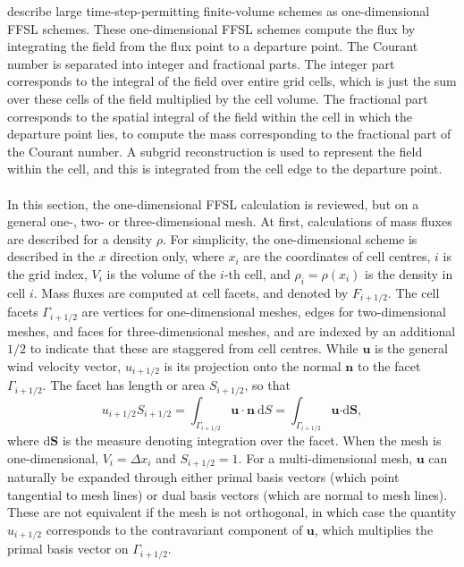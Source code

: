 \documentclass{ametsocV6.1}
\begin{document}
\citet{lin1996ffsl} describe large time-step-permitting finite-volume schemes as one-dimensional FFSL schemes. These one-dimensional FFSL schemes compute the flux by integrating the field from the flux point to a departure point. The Courant number is separated into integer and fractional parts. The integer part corresponds to the integral of the field over entire grid cells, which is just the sum over these cells of the field multiplied by the cell volume. The fractional part corresponds to the spatial integral of the field within the cell in which the departure point lies, to compute the mass corresponding to the fractional part of the Courant number. A subgrid reconstruction is used to represent the field within the cell, and this is integrated from the cell edge to the departure point. \\
\\
In this section, the one-dimensional FFSL calculation is reviewed, but on a general one-, two- or three-dimensional mesh.
At first, calculations of mass fluxes are described for a density $\rho$.
For simplicity, the one-dimensional scheme is described in the $x$ direction only, where $x_i$ are the coordinates of cell centres, $i$ is the grid index, $V_i$ is the volume of the $i$-th cell, and $\rho_i=\rho(x_i)$ is the density in cell $i$.
Mass fluxes are computed at cell facets, and denoted by $F_{i+1/2}$.
The cell facets $\varGamma_{i+1/2}$ are vertices for one-dimensional meshes, edges for two-dimensional meshes, and faces for three-dimensional meshes, and are indexed by an additional $1/2$ to indicate that these are staggered from cell centres.
While $\bm{u}$ is the general wind velocity vector, $u_{i+1/2}$ is its projection onto the normal $\bm{n}$ to the facet $\varGamma_{i+1/2}$.
The facet has length or area $S_{i+1/2}$, so that
\begin{equation} \label{eqn:u_normal}
u_{i+1/2} S_{i+1/2} =
\int_{\varGamma_{i+1/2}} \bm{u \cdot n} \ \mathrm{d}S = \int_{\varGamma_{i+1/2}} \bm{u} \bm{\cdot} \mathrm{d}\bm{S},
\end{equation}
where $\mathrm{d}\bm{S}$ is the measure denoting integration over the facet.
When the mesh is one-dimensional, $V_i=\Delta x_i$ and $S_{i+1/2}=1$.
For a multi-dimensional mesh, $\bm{u}$ can naturally be expanded through either primal basis vectors (which point tangential to mesh lines) or dual basis vectors (which are normal to mesh lines).
These are not equivalent if the mesh is not orthogonal, in which case the quantity $u_{i+1/2}$ corresponds to the contravariant component of $\bm{u}$, which multiplies the primal basis vector on $\varGamma_{i+1/2}$.
\end{document}
